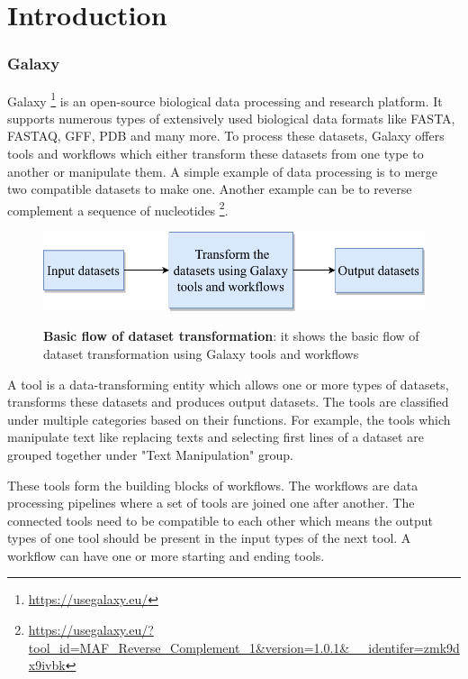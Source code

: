 \chapter{Introduction}\label{chap:introduction}
\subsection{Galaxy}
Galaxy {\footnote{\url{https://usegalaxy.eu/}}} is an open-source biological data processing and research platform. It supports numerous types of extensively used biological data formats like FASTA, FASTAQ, GFF, PDB and many more. To process these datasets, Galaxy offers tools and workflows which either transform these datasets from one type to another or manipulate them. A simple example of data processing is to merge two compatible datasets to make one. Another example can be to reverse complement a sequence of nucleotides \footnote{\url{https://usegalaxy.eu/?tool_id=MAF_Reverse_Complement_1&version=1.0.1&__identifer=zmk9dx9ivbk}}.

\begin{figure}[h]
\begin{centering}
    {\includegraphics[scale=0.8]{figures/image_Galaxy_1.pdf}}
    \caption[Basic flow of dataset transformation]{\textbf{Basic flow of dataset transformation}: it shows the basic flow of dataset transformation using Galaxy tools and workflows}
\end{centering}
\end{figure}

A tool is a data-transforming entity which allows one or more types of datasets, transforms these datasets and produces output datasets. The tools are classified under multiple categories based on their functions. For example, the tools which manipulate text like replacing texts and selecting first lines of a dataset are grouped together under "Text Manipulation" group.

These tools form the building blocks of workflows. The workflows are data processing pipelines where a set of tools are joined one after another. The connected tools need to be compatible to each other which means the output types of one tool should be present in the input types of the next tool. A workflow can have one or more starting and ending tools.


